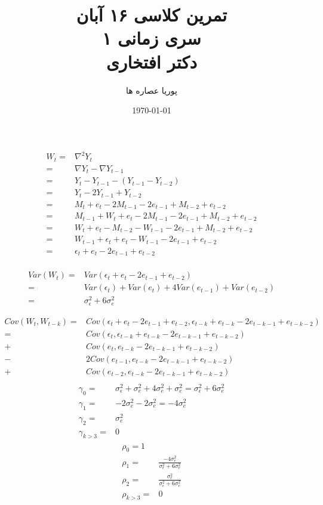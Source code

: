 \documentclass[a5paper,10pt]{report}
\author{پوریا عصاره ها}
\title{
    تمرین کلاسی ۱۶ آبان\\
    سری زمانی ۱ \\
    دکتر افتخاری
}
\date{\today}
\begin{document}
\maketitle

\begin{align*}
    W_t = & \nabla^2 Y_t \\
        = & \nabla Y_t - \nabla Y_{t-1} \\
        = & Y_t - Y_{t-1} - (Y_{t-1} - Y_{t-2}) \\ 
        = & Y_t -2Y_{t-1} + Y_{t-2} \\
        = & M_t + e_t - 2M_{t-1} -2e_{t-1} + M_{t-2} + e_{t-2} \\
        = & M_{t-1} + W_t + e_t - 2M_{t-1} -2e_{t-1} + M_{t-2} + e_{t-2} \\
        = & W_t + e_t - M_{t-2} - W_{t-1} -2e_{t-1} + M_{t-2} + e_{t-2} \\
        = & W_{t-1} + \epsilon_t + e_t - W_{t-1} -2e_{t-1} + e_{t-2} \\ 
        = & \epsilon_t + e_t -2e_{t-1} + e_{t-2} \\ 
\end{align*}

\begin{align*}
    Var(W_t) = & Var(\epsilon_t + e_t -2e_{t-1} + e_{t-2}) \\
            = & Var(\epsilon_t) + Var(e_t) +4Var(e_{t-1}) + Var(e_{t-2}) \\
            = & \sigma^2_\epsilon + 6\sigma^2_e
\end{align*}

\begin{align*}
    Cov(W_t , W_{t-k}) = & Cov(\epsilon_t + e_t -2e_{t-1} + e_{t-2}, \epsilon_{t-k} + e_{t-k} -2e_{t-k-1} + e_{t-k-2}) \\
    = & Cov(\epsilon_t, \epsilon_{t-k} + e_{t-k} -2e_{t-k-1} + e_{t-k-2}) \\
    + & Cov(e_t, e_{t-k} -2e_{t-k-1} + e_{t-k-2}) \\
    - & 2Cov(e_{t-1}, e_{t-k} -2e_{t-k-1} + e_{t-k-2}) \\
    + & Cov(e_{t-2}, e_{t-k} -2e_{t-k-1} + e_{t-k-2}) \\
\end{align*}
\begin{align}
    \gamma_0 = & \sigma^2_\epsilon + \sigma^2_e + 4\sigma^2_e + \sigma_e^2 = \sigma^2_\epsilon + 6\sigma^2_e \\
    \gamma_1 = & -2\sigma_e^2 - 2\sigma_e^2  = -4\sigma_e^2\\
    \gamma_2 = & \sigma_e^2 \\
    \gamma_{k>3} = & 0
\end{align}
\begin{align}
    \rho_0 = 1 \\
    \rho_1 = & \frac{-4\sigma_e^2}{\sigma^2_\epsilon + 6\sigma^2_e} \\
    \rho_2 = & \frac{\sigma_e^2}{\sigma^2_\epsilon + 6\sigma^2_e} \\
    \rho_{k>3} = & 0
\end{align}
\end{document}
